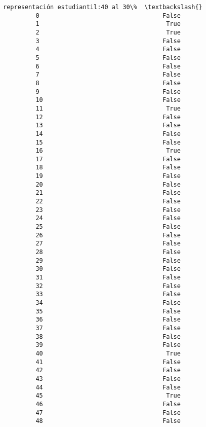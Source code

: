 \documentclass[11pt]{article}
\begin{document}
\begin{Verbatim}[commandchars=\\\{\}]
             representación estudiantil:40 al 30\%  \textbackslash{}
         0                                  False   
         1                                   True   
         2                                   True   
         3                                  False   
         4                                  False   
         5                                  False   
         6                                  False   
         7                                  False   
         8                                  False   
         9                                  False   
         10                                 False   
         11                                  True   
         12                                 False   
         13                                 False   
         14                                 False   
         15                                 False   
         16                                  True   
         17                                 False   
         18                                 False   
         19                                 False   
         20                                 False   
         21                                 False   
         22                                 False   
         23                                 False   
         24                                 False   
         25                                 False   
         26                                 False   
         27                                 False   
         28                                 False   
         29                                 False   
         30                                 False   
         31                                 False   
         32                                 False   
         33                                 False   
         34                                 False   
         35                                 False   
         36                                 False   
         37                                 False   
         38                                 False   
         39                                 False   
         40                                  True   
         41                                 False   
         42                                 False   
         43                                 False   
         44                                 False   
         45                                  True   
         46                                 False   
         47                                 False   
         48                                 False   
         

\end{Verbatim}
\end{document}
